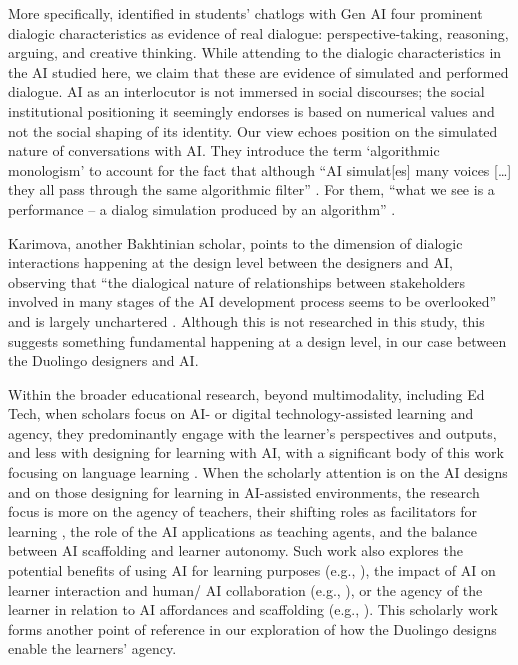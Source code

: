\documentclass[english]{textolivre}
\begin{document}
More specifically, \textcite{tang2025dialogic} identified in students’ chatlogs with Gen AI four prominent dialogic characteristics as evidence of real dialogue: perspective-taking, reasoning, arguing, and creative thinking. While attending to the dialogic characteristics in the AI studied here, we claim that these are evidence of simulated and performed dialogue. AI as an interlocutor is not immersed in social discourses; the social institutional positioning it seemingly endorses is based on numerical values and not the social shaping of its identity. Our view echoes  position on the simulated nature of conversations with AI. They introduce the term ‘algorithmic monologism’ to account for the fact that although “AI simulat[es] many voices […] they all pass through the same algorithmic filter” \cite[n.p.]{duquepereira2025chatbots}. For them, “what we see is a performance – a dialog simulation produced by an algorithm” \cite[n.p.]{duquepereira2025chatbots}.

Karimova, another Bakhtinian scholar, points to the dimension of dialogic interactions happening at the design level between the designers and AI, observing that “the dialogical nature of relationships between stakeholders involved in many stages of the AI development process seems to be overlooked” and is largely unchartered \cite[p. 3625-6]{karimova2025dialogic}. Although this is not researched in this study, this suggests something fundamental happening at a design level, in our case between the Duolingo designers and AI.

Within the broader educational research, beyond multimodality, including Ed Tech, when scholars focus on AI- or digital technology-assisted learning and agency, they predominantly engage with the learner’s perspectives and outputs, and less with designing for learning with AI, with a significant body of this work focusing on language learning \cite{garzon2025systematic}. When the scholarly attention is on the AI designs and on those designing for learning in AI-assisted environments, the research focus is more on the agency of teachers, their shifting roles as facilitators for learning \cite{purba2025ai}, the role of the AI applications as teaching agents, and the balance between AI scaffolding and learner autonomy. Such work also explores the potential benefits of using AI for learning purposes (e.g., \textcite{dai2025agency}), the impact of AI on learner interaction and human/ AI collaboration (e.g., \textcite{seo2021impact}), or the agency of the learner in relation to AI affordances and scaffolding (e.g., \textcite{abrams2025reflexive,brod2023agency,dai2025agency}). This scholarly work forms another point of reference in our exploration of how the Duolingo designs enable the learners’ agency.
\end{document}
